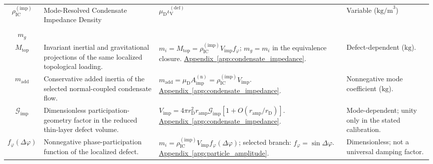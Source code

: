 \begin{longtable}{@{} c p{5.5cm} p{4cm} p{3.5cm} @{}}
$\rho_{\mathrm{IC}}^{(\mathrm{imp})}$ & Mode-Resolved Condensate Impedance Density & $\mu_{\mathrm{D}}\iota_{\mathrm{V}}^{(\mathrm{def})}$ & Variable ($\text{kg/m}^3$) \\

\begin{tabular}[c]{@{}c@{}}$m_i$ \\ $m_g$ \\ $M_{\mathrm{top}}$\end{tabular} & {\raggedright Invariant inertial and gravitational projections of the same localized topological loading.\par} & {\raggedright $m_i=M_{\mathrm{top}}=\rho_{\mathrm{IC}}^{(\mathrm{imp})}V_{\mathrm{imp}}f_\varphi$; $m_g=m_i$ in the equivalence closure. \newline \hyperref[app:condensate_impedance]{Appendix~\ref*{app:condensate_impedance}}.\par} & {\raggedright Defect-dependent ($\mathrm{kg}$).\par} \\

$m_{\mathrm{add}}$ & {\raggedright Conservative added inertia of the selected normal-coupled condensate flow.\par} & {\raggedright $m_{\mathrm{add}}=\mu_{\mathrm D}A_{\mathrm{imp}}^{(\mathrm n)}=\rho_{\mathrm{IC}}^{(\mathrm{imp})}V_{\mathrm{imp}}$. \newline \hyperref[app:condensate_impedance]{Appendix~\ref*{app:condensate_impedance}}.\par} & {\raggedright Nonnegative mode coefficient ($\mathrm{kg}$).\par} \\

$\mathcal G_{\mathrm{imp}}$ & {\raggedright Dimensionless participation-geometry factor in the reduced thin-layer defect volume.\par} & {\raggedright $V_{\mathrm{imp}}=4\pi r_{\mathrm D}^2r_{\mathrm{amp}}\mathcal G_{\mathrm{imp}}[1+O(r_{\mathrm{amp}}/r_{\mathrm D})]$. \newline \hyperref[app:condensate_impedance]{Appendix~\ref*{app:condensate_impedance}}.\par} & {\raggedright Mode-dependent; unity only in the stated calibration.\par} \\

$f_\varphi(\Delta\varphi)$ & {\raggedright Nonnegative phase-participation function of the localized defect.\par} & {\raggedright $m_i=\rho_{\mathrm{IC}}^{(\mathrm{imp})}V_{\mathrm{imp}}f_\varphi(\Delta\varphi)$; selected branch: $f_\varphi=\sin\Delta\varphi$. \newline \hyperref[app:particle_amplitude]{Appendix~\ref*{app:particle_amplitude}}.\par} & {\raggedright Dimensionless; not a universal damping factor.\par} \\


\end{longtable}
